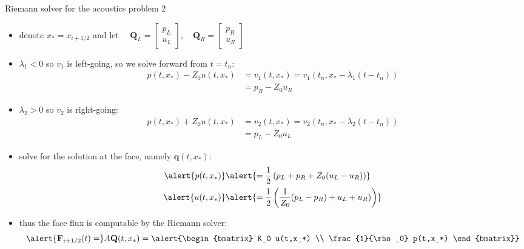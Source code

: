 \documentclass[10pt,hyperref,dvipsnames]{beamer}
\newcommand{\bq}{\mathbf{q}}
\newcommand{\bF}{\mathbf{F}}
\newcommand{\bQ}{\mathbf{Q}}
\begin{document}
\begin{frame}{Riemann solver for the acoustics problem 2}

\begin{itemize}
\item denote $x_*=x_{i+1/2}$ and let $\quad \bQ_L = \begin{bmatrix} p_L \\ u_L \end{bmatrix}, \quad \bQ_R = \begin{bmatrix} p_R \\ u_R \end{bmatrix}$
\item $\lambda_1 < 0$ so $v_1$ is left-going, so we solve forward from $t=t_n$:
\begin{align*}
p(t,x_*) - Z_0 u(t,x_*) &= v_1(t,x_*) = v_1(t_n,x_*-\lambda_1 (t-t_n)) \\
   &= p_R - Z_0 u_R
\end{align*}
\item $\lambda_2 > 0$ so $v_2$ is right-going:
\begin{align*}
p(t,x_*) + Z_0 u(t,x_*) &= v_2(t,x_*) = v_2(t_n,x_*-\lambda_2 (t-t_n)) \\
   &= p_L - Z_0 u_L
\end{align*}
\item solve for the solution at the face, namely $\bq(t,x_*)$:
\begin{align*}
\alert{p(t,x_*)} &\alert{= \frac{1}{2} \left(p_L + p_R + Z_0 (u_L - u_R)\right)} \\
\alert{u(t,x_*)} &\alert{= \frac{1}{2} \left(\frac{1}{Z_0} (p_L - p_R) + u_L + u_R)\right)}
\end{align*}
\item thus the face flux is \alert{computable} by the Riemann solver:
    $$\alert{\bF_{i+1/2}(t) =} A \bQ(t,x_*) = \alert{\begin{bmatrix} K_0 u(t,x_*) \\ \frac{1}{\rho_0} p(t,x_*) \end{bmatrix}}$$
\end{itemize}
\end{frame}
\end{document}

